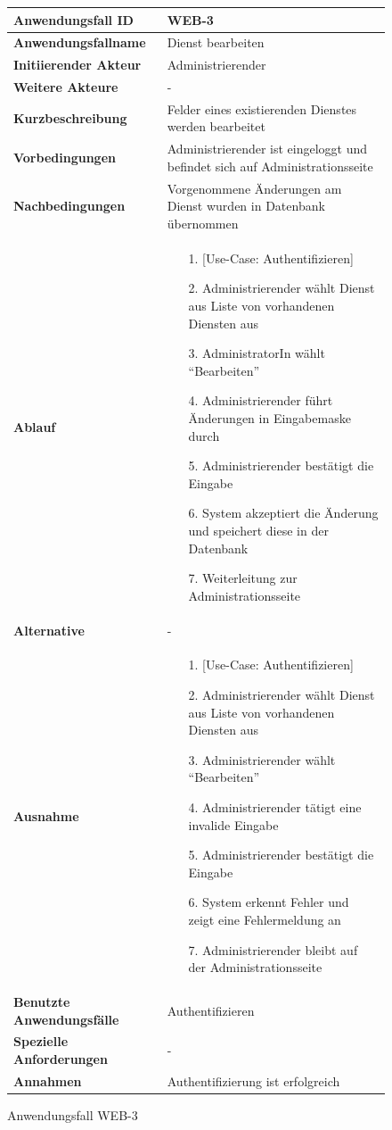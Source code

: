 \begin{figure}[h]
	\centering
	\begin{tabularx}{\textwidth}{ X | X }
		\textbf{Anwendungsfall ID} & WEB-3 \\ \hline
		\textbf{Anwendungsfallname} & Dienst bearbeiten \\ \hline
		\textbf{Initiierender Akteur} & Administrierender \\ \hline
		\textbf{Weitere Akteure} & - \\ \hline
		\textbf{Kurzbeschreibung} & Felder eines existierenden Dienstes werden bearbeitet \\ \hline
		\textbf{Vorbedingungen} & Administrierender ist eingeloggt und befindet sich auf Administrationsseite \\ \hline
		\textbf{Nachbedingungen} & Vorgenommene Änderungen am Dienst wurden in Datenbank übernommen \\ \hline
		\textbf{Ablauf} &
		\begin{enumerate}
			\item [1.] [Use-Case: Authentifizieren]
			\item [2.] Administrierender wählt Dienst aus Liste von vorhandenen Diensten aus
			\item [3.] AdministratorIn wählt ``Bearbeiten''
			\item [4.] Administrierender führt Änderungen in Eingabemaske durch
			\item [5.] Administrierender bestätigt die Eingabe
			\item [6.] System akzeptiert die Änderung und speichert diese in der Datenbank
			\item [7.] Weiterleitung zur Administrationsseite
		\end{enumerate} \\ \hline
		\textbf{Alternative} & - \\ \hline
		\textbf{Ausnahme} &
		\begin{enumerate}
			\item [1.] [Use-Case: Authentifizieren]
			\item [2.] Administrierender wählt Dienst aus Liste von vorhandenen Diensten aus
			\item [3.] Administrierender wählt ``Bearbeiten''
			\item [4.] Administrierender tätigt eine invalide Eingabe
			\item [5.] Administrierender bestätigt die Eingabe
			\item [6.] System erkennt Fehler und zeigt eine Fehlermeldung an
			\item [7.] Administrierender bleibt auf der Administrationsseite
		\end{enumerate}  \\ \hline
		\textbf{Benutzte Anwendungsfälle} & Authentifizieren \\ \hline
		\textbf{Spezielle Anforderungen} & - \\ \hline
		\textbf{Annahmen} & Authentifizierung ist erfolgreich
	\end{tabularx}
	\caption{Anwendungsfall WEB-3}
	\label{fig:anwendungsfall-server-tabelle-web-3}
\end{figure}

